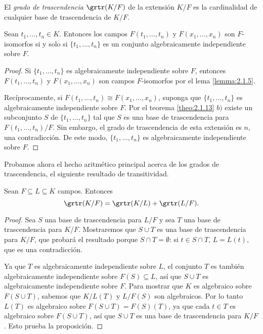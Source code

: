 \begin{definition}
  El \emph{grado de trascendencia} $\grtr(K/F)$ de la extensión $K/F$ es la cardinalidad de cualquier base de trascendencia de $K/F$.
\end{definition}

\begin{corollary}
  Sean $t_1, \ldots, t_n \in K$. Entonces los campos $F(t_1, \ldots, t_n)$ y $F(x_1, \ldots, x_n)$ son $F$-isomorfos si y solo si $\{t_1,\ldots, t_n\}$ es un conjunto algebraicamente independiente sobre $F$.
\end{corollary}
\begin{proof}
  Si $\{t_1, \ldots, t_n\}$ es algebraicamente independiente sobre $F$, entonces $F(t_1, \ldots, t_n)$ y $F(x_1, \ldots, x_n)$ son campos $F$-isomorfos por el lema \ref{lemma:2.1.5}.

  Recíprocamente, si $F(t_1, \ldots, t_n) \cong F(x_1, \ldots, x_n)$, suponga que $\{t_1, \ldots, t_n\}$ es algebraicamente independiente sobre $F$. Por el teorema \ref{theo:2.1.13} $b)$ existe un subconjunto $S$ de $\{t_1, \ldots, t_n\}$ tal que $S$ es una base de trascendencia para $F(t_1, \ldots, t_n)/F$. Sin embargo, el grado de trascendencia de esta extensión es $n$, una contradicción. De este modo, $\{t_1, \ldots, t_n\}$ es algebraicamente independiente sobre $F$.
\end{proof}

Probamos ahora el hecho aritmético principal acerca de los grados de trascendencia, el siguiente resultado de transitividad.

\begin{proposition}
  Sean $F \subseteq L \subseteq K$ campos. Entonces
  \[
    \grtr(K/F) = \grtr(K/L) + \grtr(L/F).
  \]
\end{proposition}
\begin{proof}
  Sea $S$ una base de trascendencia para $L/F$ y sea $T$ una base de trascendencia para $K/F$. Mostraremos que $S \cup T$ es una base de trascendencia para $K/F$, que probará el resultado porque $S \cap T = \emptyset$: si $t \in S \cap T$, $L = L(t)$, que es  una contradicción.

  Ya que $T$ es algebraicamente independiente sobre $L$, el conjunto $T$ es también algebraicamente independiente sobre $F(S) \subseteq L$, así que $S \cup T$ es algebraicamente independiente sobre $F$. Para mostrar que $K$ es algebraico sobre $F(S \cup T)$, sabemos que $K/L(T)$ y $L/F(S)$ son algebraicos. Por lo tanto $L(T)$ es algebraico sobre $F(S \cup T)= F(S)(T)$, ya que cada $t \in T$ es algebraico sobre $F(S \cup T)$, así que $S \cup T$ es una base de trascendencia para $K/F$. Esto prueba la proposición.
\end{proof}

